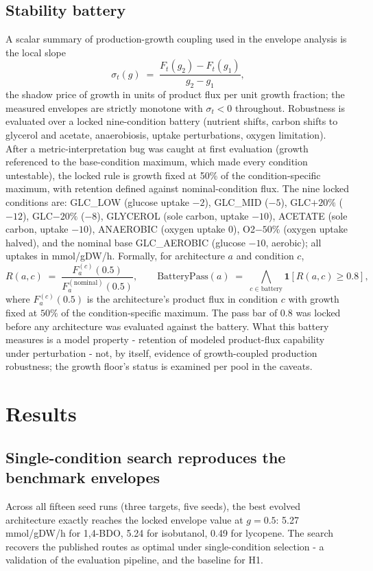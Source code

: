 \documentclass[12pt,a4paper]{article}
\begin{document}
\subsection{Stability battery}
A scalar summary of production-growth coupling used in the envelope analysis is the local slope
\begin{equation}
\sigma_t(g) \;=\; \frac{F_t(g_2) - F_t(g_1)}{g_2 - g_1},
\end{equation}
the shadow price of growth in units of product flux per unit growth fraction; the measured envelopes are strictly monotone with $\sigma_t < 0$ throughout.
Robustness is evaluated over a locked nine-condition battery (nutrient shifts, carbon shifts to glycerol and acetate, anaerobiosis, uptake perturbations, oxygen limitation). After a metric-interpretation bug was caught at first evaluation (growth referenced to the base-condition maximum, which made every condition untestable), the locked rule is growth fixed at 50\% of the condition-specific maximum, with retention defined against nominal-condition flux. The nine locked conditions are: GLC\_LOW (glucose uptake $-2$), GLC\_MID ($-5$), GLC$+20\%$ ($-12$), GLC$-20\%$ ($-8$), GLYCEROL (sole carbon, uptake $-10$), ACETATE (sole carbon, uptake $-10$), ANAEROBIC (oxygen uptake 0), O2$-50\%$ (oxygen uptake halved), and the nominal base GLC\_AEROBIC (glucose $-10$, aerobic); all uptakes in mmol/gDW/h. Formally, for architecture $a$ and condition $c$,
\begin{equation}
R(a, c) \;=\; \frac{F_a^{(c)}(0.5)}{F_a^{(\mathrm{nominal})}(0.5)}, \qquad
\mathrm{BatteryPass}(a) \;=\; \bigwedge_{c \in \mathrm{battery}} \mathbf{1}\!\left[ R(a,c) \ge 0.8 \right],
\end{equation}
where $F_a^{(c)}(0.5)$ is the architecture's product flux in condition $c$ with growth fixed at $50\%$ of the condition-specific maximum. The pass bar of $0.8$ was locked before any architecture was evaluated against the battery. What this battery measures is a model property - retention of modeled product-flux capability under perturbation - not, by itself, evidence of growth-coupled production robustness; the growth floor's status is examined per pool in the caveats.

\section{Results}
\subsection{Single-condition search reproduces the benchmark envelopes}
Across all fifteen seed runs (three targets, five seeds), the best evolved architecture exactly reaches the locked envelope value at $g=0.5$: 5.27 mmol/gDW/h for 1,4-BDO, 5.24 for isobutanol, 0.49 for lycopene. The search recovers the published routes as optimal under single-condition selection - a validation of the evaluation pipeline, and the baseline for H1.
\end{document}

